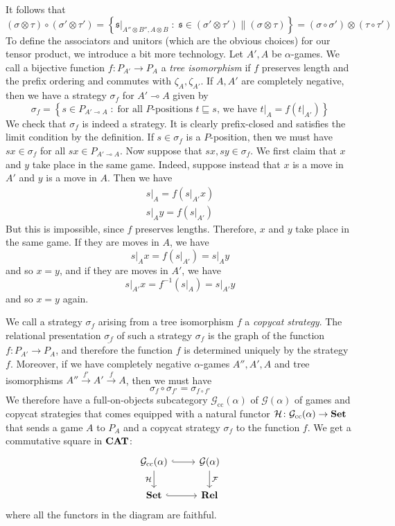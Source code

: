 \documentclass[11pt]{article} %
\theoremstyle{plain} %
\theoremstyle{definition} %
\theoremstyle{note}
\theoremstyle{exercisestyle}
\newcommand{\catname}[1]{{\normalfont\textbf{#1}}}
\newcommand{\CAT}{\catname{CAT}}
\newcommand{\Set}{\catname{Set}}
\newcommand{\Rel}{\catname{Rel}}
\newcommand*\from{\colon}
\newcommand{\cmap}[3]{#1\from{}#2\to{}#3}
\def \inv {^{-1}}
\newcommand{\tensor}{\otimes}
\renewcommand{\implies}{\multimap}
\newcommand{\comp}[2]{#1 \circ #2}
\newcommand{\G}{\mathcal G}
\newcommand{\suchthat}{\;\colon\;}
\newcommand{\F}{\mathcal F}
\newcommand{\s}{\mathfrak s}
\newcommand{\bracketed}[1]{\left({#1}\right)}
\newcommand{\prefix}{\sqsubseteq}
\newcommand{\grel}[1]{\underline{#1}}
\DeclareMathOperator{\cc}{cc}
\renewcommand{\H}{\mathcal H}
\begin{document}
It follows that
\[
  \comp{(\sigma\tensor\tau)}{(\sigma'\tensor\tau')}
  = \left\{\s\vert_{A''\tensor B'', A\tensor B}\suchthat\s\in(\sigma'\tensor\tau')\|(\sigma\tensor\tau)\right\}
  = (\comp\sigma{\sigma'})\tensor(\comp\tau{\tau'})
  \]
To define the associators and unitors (which are the obvious choices) for our tensor product, we introduce a bit more technology.  Let $A',A$ be $\alpha$-games.  We call a bijective function $\cmap{f}{P_{A'}}{P_A}$ a \emph{tree isomorphism} if $f$ preserves length and the prefix ordering and commutes with $\zeta_A,\zeta_{A'}$.  If $A,A'$ are completely negative, then we have a strategy $\sigma_f$ for $A'\implies A$ given by
\[
  \sigma_f = \left\{s\in P_{A'\implies A}\suchthat \textrm{for all $P$-positions $t\prefix s$, we have $t\vert_A = f\left(t\vert_{A'}\right)$}\right\}
  \]
We check that $\sigma_f$ is indeed a strategy.  It is clearly prefix-closed and satisfies the limit condition by the definition.  If $s\in\sigma_f$ is a $P$-position, then we must have $sx\in\sigma_f$ for all $sx\in P_{A'\implies A}$.  Now suppose that $sx,sy\in \sigma_f$.  We first claim that $x$ and $y$ take place in the same game.  Indeed, suppose instead that $x$ is a move in $A'$ and $y$ is a move in $A$.  Then we have
\begin{gather*}
  s\vert_A = f\bracketed{s\vert_{A'}x} \\
  s\vert_Ay = f\bracketed{s\vert_{A'}}
\end{gather*}
But this is impossible, since $f$ preserves lengths.  Therefore, $x$ and $y$ take place in the same game.  If they are moves in $A$, we have
\[
  s\vert_A x = f\bracketed{s\vert_{A'}} = s\vert_Ay
  \]
and so $x=y$, and if they are moves in $A'$, we have
\[
  s\vert_{A'}x = f\inv\bracketed{s\vert_A} = s\vert_{A'}y
  \]
and so $x=y$ again.

We call a strategy $\sigma_f$ arising from a tree isomorphism $f$ a \emph{copycat strategy}.  The relational presentation $\grel{\sigma_f}$ of such a strategy $\sigma_f$ is the graph of the function $\cmap{f}{P_{A'}}{P_A}$, and therefore the function $f$ is determined uniquely by the strategy $f$.  Moreover, if we have completely negative $\alpha$-games $A'', A', A$ and tree isomorphisms $A''\xrightarrow{f'}A'\xrightarrow{f}A$, then we must have
\[
  \comp{\sigma_f}{\sigma_{f'}} = \sigma_{\comp{f}{f'}}
  \]
We therefore have a full-on-objects subcategory $\G_{\cc}(\alpha)$ of $\G(\alpha)$ of games and copycat strategies that comes equipped with a natural functor $\cmap{\H}{\G_{\cc}(\alpha)}{\Set}$ that sends a game $A$ to $P_A$ and a copycat strategy $\sigma_f$ to the function $f$.  We get a commutative square in $\CAT$:
\[
  \begin{tikzcd}
    \G_{\cc}(\alpha) \arrow[r, hook] \arrow[d, "\H"']
      & \G(\alpha) \arrow[d, "\F"] \\
    \Set \arrow[r, hook]
      & \Rel
  \end{tikzcd}
  \]
where all the functors in the diagram are faithful.  
\end{document}

